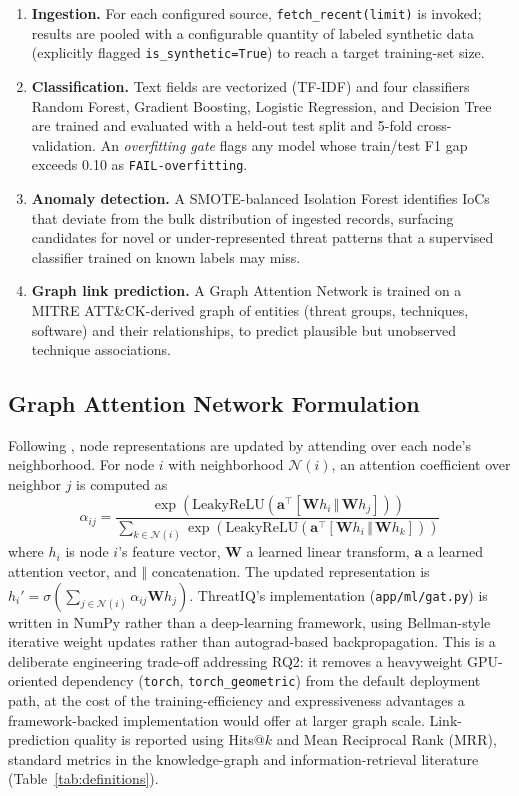 \documentclass[conference]{IEEEtran}
\begin{document}
\begin{enumerate}
\item \textbf{Ingestion.} For each configured source, \texttt{fetch\_recent(limit)} is invoked; results are pooled with a configurable quantity of labeled synthetic data (explicitly flagged \texttt{is\_synthetic=True}) to reach a target training-set size.
\item \textbf{Classification.} Text fields are vectorized (TF-IDF) and four classifiers \textemdash{} Random Forest, Gradient Boosting, Logistic Regression, and Decision Tree \textemdash{} are trained and evaluated with a held-out test split and 5-fold cross-validation. An \emph{overfitting gate} flags any model whose train/test F1 gap exceeds 0.10 as \texttt{FAIL-overfitting}.
\item \textbf{Anomaly detection.} A SMOTE-balanced Isolation Forest \cite{liu2008isolationforest,chawla2002smote} identifies IoCs that deviate from the bulk distribution of ingested records, surfacing candidates for novel or under-represented threat patterns that a supervised classifier trained on known labels may miss.
\item \textbf{Graph link prediction.} A Graph Attention Network is trained on a MITRE ATT\&CK-derived graph of entities (threat groups, techniques, software) and their relationships, to predict plausible but unobserved technique associations.
\end{enumerate}

\subsection{Graph Attention Network Formulation}
\label{sec:gat-formulation}
Following \cite{velickovic2018gat}, node representations are updated by attending over each node's neighborhood. For node $i$ with neighborhood $\mathcal{N}(i)$, an attention coefficient over neighbor $j$ is computed as
\begin{equation}
\alpha_{ij} = \frac{\exp\left(\mathrm{LeakyReLU}\left(\mathbf{a}^{\top}[\mathbf{W}h_i \,\Vert\, \mathbf{W}h_j]\right)\right)}
{\sum_{k \in \mathcal{N}(i)} \exp\left(\mathrm{LeakyReLU}\left(\mathbf{a}^{\top}[\mathbf{W}h_i \,\Vert\, \mathbf{W}h_k]\right)\right)}
\end{equation}
where $h_i$ is node $i$'s feature vector, $\mathbf{W}$ a learned linear transform, $\mathbf{a}$ a learned attention vector, and $\Vert$ concatenation. The updated representation is $h_i' = \sigma\left(\sum_{j \in \mathcal{N}(i)} \alpha_{ij} \mathbf{W} h_j\right)$. ThreatIQ's implementation (\texttt{app/ml/gat.py}) is written in NumPy rather than a deep-learning framework, using Bellman-style iterative weight updates rather than autograd-based backpropagation. This is a deliberate engineering trade-off addressing RQ2: it removes a heavyweight GPU-oriented dependency (\texttt{torch}, \texttt{torch\_geometric}) from the default deployment path, at the cost of the training-efficiency and expressiveness advantages a framework-backed implementation would offer at larger graph scale. Link-prediction quality is reported using Hits@$k$ and Mean Reciprocal Rank (MRR), standard metrics in the knowledge-graph and information-retrieval literature (Table~\ref{tab:definitions}).
\end{document}
